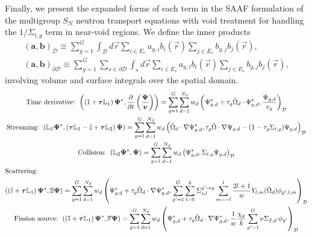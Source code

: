 \documentclass[letterpaper]{mc2025}
\begin{document}
Finally, we present the expanded forms of each term in the \gls{SAAF} formulation of the multigroup
$S_N$ neutron transport equations with void treatment \cite{wang_diffusion_2014} for handling the
$1/\Sigma_{t,g}$ term in near-void regions. We define the inner products
%
\begin{gather}
  \left(\bm{a},\bm{b}\right)_\mathcal{D} \equiv \sum^G_{g=1} \int_\mathcal{D}d\vec{r}
  \sum_{i\in E_e}a_{g,i}b_i(\vec{r})\sum_{j\in E_e}b_{g,j}b_j(\vec{r}), \\
  \left(\bm{a},\bm{b}\right)_{\partial\mathcal{D}} \equiv \sum^G_{g=1}
  \sum_{s\in\partial\mathcal{D}}\int_s d\vec{r}\sum_{i\in E_s}a_{g,i}b_i(\vec{r})\sum_{j\in E_s}
  b_{g,j}b_j(\vec{r}),
\end{gather}
%
involving volume and surface integrals over the spatial domain.
%
\begin{gather}
  \mbox{Time derivative: }
  \left(\left(\mathbb{I}+\bm{\tau}\mathbb{L}_1\right)\bm{\Psi}^*,
  \frac{\partial}{\partial t}\left(\frac{\bm{\Psi}}{\bm{v}}\right)\right) =
  \sum^G_{g=1}\sum^{N_d}_{d=1}w_d\left(\Psi^*_{g,d}+\tau_g\hat{\Omega}_d\cdot\Psi^*_{g,d},
  \frac{\Psi_{g,d}}{v_g}\right)_\mathcal{D} \label{eq:time-derivative} \\
  \mbox{Streaming: }
  \left(\mathbb{L}_1\bm{\Psi}^*,
  \left(\bm{\tau}\mathbb{L}_1-\mathbb{I}+\bm{\tau}\mathbb{L}_2\right)\bm{\Psi}\right) =
  \sum^G_{g=1}\sum^{N_d}_{d=1}w_d\left(\hat{\Omega}_d\cdot\nabla\Psi^*_{g,d},\tau_g\hat{\Omega}
  \cdot\nabla\Psi_{g,d}-(1-\tau_g\Sigma_{t,g})\Psi_{g,d}\right)_\mathcal{D} \\
  \mbox{Collision: }
  \left(\mathbb{L}_2\bm{\Psi}^*,\bm{\Psi}\right) =
  \sum^G_{g=1}\sum^{N_d}_{d=1}w_d\left(\Psi^*_{g,d},\Sigma_{t,g}\Psi_{g,d}\right)_\mathcal{D} \\
  \shortintertext{Scattering:}
  \left(\left(\mathbb{I}+\bm{\tau}\mathbb{L}_1\right)\bm{\Psi}^*,\mathbb{S}\bm{\Psi}\right) =
  \sum^G_{g=1}\sum^{N_d}_{d=1}w_d\left(\Psi^*_{g,d}+\tau_g\hat{\Omega}_d\cdot\nabla\Psi^*_{g,d},
  \sum^G_{g'=1}\sum^L_{l=0}\Sigma^{g'\rightarrow g}_{s,l}\sum^l_{m=-l}
  \frac{2l+1}{w}Y_{l,m}(\hat{\Omega}_d)\phi_{g',l,m}\right)_\mathcal{D} \\
  \mbox{Fission source: }
  \left(\left(\mathbb{I}+\bm{\tau}\mathbb{L}_1\right)\bm{\Psi}^*,\mathbb{F}\bm{\Psi}\right) =
  \sum^G_{g=1}\sum^{N_d}_{d=1}w_d\left(\Psi^*_{g,d}+\tau_g\hat{\Omega}_d\cdot\nabla\Psi^*_{g,d},
  \frac{1}{w}\frac{\chi_g}{k}\sum^G_{g'=1}\nu\Sigma_{f,g'}\phi_{g'}\right)_\mathcal{D}
\end{gather}
\end{document}
